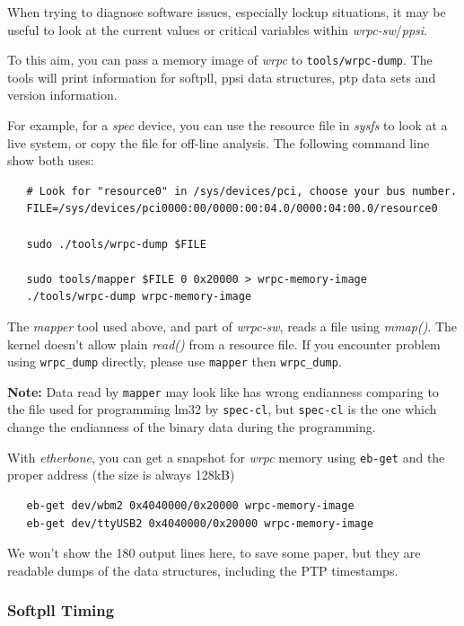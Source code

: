 \documentclass[a4paper, 12pt]{article}
\begin{document}
When trying to diagnose software issues, especially lockup situations,
it may be useful to look at the current values or critical variables
within \textit{wrpc-sw}/\textit{ppsi}.

To this aim, you can pass a memory image of \textit{wrpc} to \texttt{tools/wrpc-dump}.
The tools will print information for softpll, ppsi data structures,
ptp data sets and version information.

For example, for a \textit{spec} device, you can use the resource file in
\textit{sysfs} to look at a live system, or copy the file for off-line
analysis. The following command line show both uses:

\begin{lstlisting}
   # Look for "resource0" in /sys/devices/pci, choose your bus number.
   FILE=/sys/devices/pci0000:00/0000:00:04.0/0000:04:00.0/resource0

   sudo ./tools/wrpc-dump $FILE

   sudo tools/mapper $FILE 0 0x20000 > wrpc-memory-image
   ./tools/wrpc-dump wrpc-memory-image
\end{lstlisting}

The \textit{mapper} tool used above, and part of \textit{wrpc-sw}, reads a file
using \textit{mmap()}. The kernel doesn't allow plain \textit{read()} from a
resource file. If you encounter problem using \texttt{wrpc\_dump} directly,
please use \texttt{mapper} then \texttt{wrpc\_dump}.

\textbf{Note:} Data read by \texttt{mapper} may look like has wrong endianness comparing
to the file used for programming lm32 by \texttt{spec-cl}, but \texttt{spec-cl} is the
one which change the endianness of the binary data during the programming.

With \textit{etherbone}, you can get a snapshot for \textit{wrpc} memory using
\texttt{eb-get} and the proper address (the size is always 128kB)

\begin{lstlisting}
   eb-get dev/wbm2 0x4040000/0x20000 wrpc-memory-image
   eb-get dev/ttyUSB2 0x4040000/0x20000 wrpc-memory-image
\end{lstlisting}

We won't show the 180 output lines here, to save some paper, but they
are readable dumps of the data structures, including the PTP timestamps.

\subsubsection{Softpll Timing}
\label{spll Softpll Timing}
\end{document}
